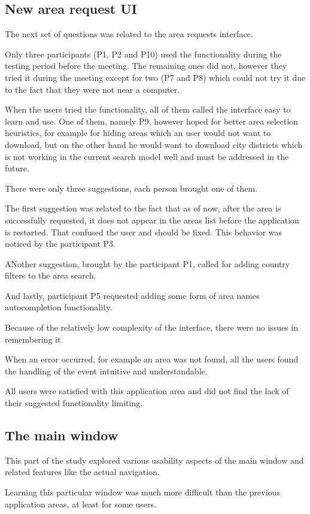 \documentclass[nolof,digital]{fithesis3}
\begin{document}
\subsection{New area request UI}
The next set of questions was related to the area requests interface.

Only three participants (P1, P2 and P10) used the functionality during the testing period before the meeting. The remaining ones did not, however they tried it during the meeting except for two (P7 and P8) which could not try it due to the fact that they were not near a computer.

When the users tried the functionality, all of them called the interface easy to learn and use. One of them, namely P9, however hoped for better area selection heuristics, for example for hiding areas which an user would not want to download, but on the other hand he would want to download city districts which is not working in the current search model well and must be addressed in the future.

There were only three suggestions, each person brought one of them.

The first suggestion was related to the fact that as of now, after the area is successfully requested, it does not appear in the areas list before the application is restarted. That confused the user and should be fixed. This behavior was noticed by the participant P3.

ANother suggestion, brought by the participant P1, called for adding country filters to the area search. 

And lastly, participant P5 requested adding some form of area names autocompletion functionality.

Because of the relatively low complexity of the interface, there were no issues in remembering it.

When an error occurred, for example an area was not found, all the users found the handling of the event intuitive and understandable.

All users were satisfied with this application area and did not find the lack of their suggested functionality limiting.
\subsection{The main window}
This part of the study explored various usability aspects of the main window and related features like the actual navigation.

Learning this particular window was much more difficult than the previous application areas, at least for some users.
\end{document}
